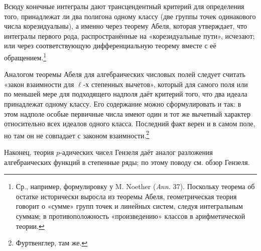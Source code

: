 \documentclass[11pt]{article}
\begin{document}
Всюду конечные интегралы дают трансцендентный критерий для определения того, принадлежат ли два полигона одному классу (две группы точек одинакового числа корезидуальны), а именно через теорему Абеля, которая утверждает, что интегралы первого рода, распространённые на «корезидуальные пути», исчезают; или через соответствующую дифференциальную теорему вместе с её обращением.\footnote{Ср., например, формулировку у M. Noether (\emph{Ann.} 37). Поскольку теорема об остатке исторически выросла из теоремы Абеля, геометрическая теория говорит о «сумме» групп точек и линейных систем, следуя интегральным суммам; в противоположность «произведению» классов в арифметической теории.}

Аналогом теоремы Абеля для алгебраических числовых полей следует считать «закон взаимности для \(\ell\)-х степенных вычетов», который для самого поля или по меньшей мере для подходящего надполя даёт критерий того, что два идеала принадлежат одному классу. Его содержание можно сформулировать и так: в этом надполе особые первичные числа имеют один и тот же вычетный характер относительно всех идеалов одного класса. Последний факт верен и в самом поле, но там он не совпадает с законом взаимности.\footnote{Фуртвенглер, там же.}

Наконец, теория \(p\)-адических чисел Гензеля даёт аналог разложения алгебраических функций в степенные ряды; по этому поводу см. обзор Гензеля.
\end{document}
